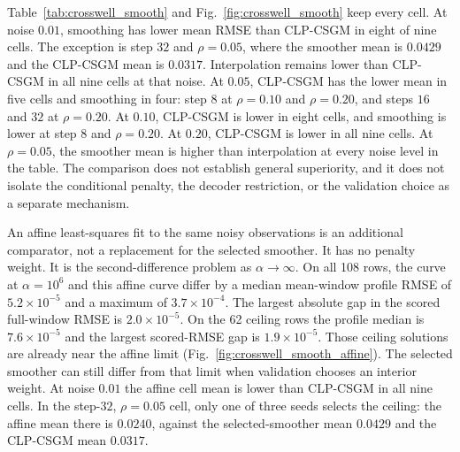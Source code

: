 \begin{table}[htbp]
  \centering
  \caption{Interpolation, validation-selected second-difference smoothing, and
  CLP-CSGM Ridge on the noise sweep. Entries are mean full-window RMSE over
  seeds $\{7,23,41\}$, rounded to four decimals. The smoother does not use
  the dense logs. These noise levels were used for sensitivity analysis and
  were not calibrated to field measurement uncertainties.}
  \label{tab:crosswell_smooth}
  \small
\end{table}

Table~\ref{tab:crosswell_smooth} and
Fig.~\ref{fig:crosswell_smooth} keep every cell. At noise $0.01$, smoothing
has lower mean RMSE than CLP-CSGM in eight of nine cells. The exception is
step $32$ and $\rho=0.05$, where the smoother mean is $0.0429$ and the
CLP-CSGM mean is $0.0317$. Interpolation remains lower than CLP-CSGM in all
nine cells at that noise. At $0.05$, CLP-CSGM has the lower mean in five
cells and smoothing in four: step $8$ at $\rho=0.10$ and $\rho=0.20$, and
steps $16$ and $32$ at $\rho=0.20$. At $0.10$, CLP-CSGM is lower in eight
cells, and smoothing is lower at step $8$ and $\rho=0.20$. At $0.20$,
CLP-CSGM is lower in all nine cells. At $\rho=0.05$, the smoother mean is
higher than interpolation at every noise level in the table. The comparison
does not establish general superiority, and it does not isolate the
conditional penalty, the decoder restriction, or the validation choice as a
separate mechanism.

An affine least-squares fit to the same noisy observations is an additional
comparator, not a replacement for the selected smoother. It has no penalty
weight. It is the second-difference problem as $\alpha\to\infty$. On all
108 rows, the curve at $\alpha=10^{6}$ and this affine curve differ by a
median mean-window profile RMSE of $5.2\times10^{-5}$ and a maximum of
$3.7\times10^{-4}$. The largest absolute gap in the scored full-window RMSE
is $2.0\times10^{-5}$. On the 62 ceiling rows the profile median is
$7.6\times10^{-5}$ and the largest scored-RMSE gap is $1.9\times10^{-5}$.
Those ceiling solutions are already near the affine limit
(Fig.~\ref{fig:crosswell_smooth_affine}). The selected smoother can still
differ from that limit when validation chooses an interior weight. At noise
$0.01$ the affine cell mean is lower than CLP-CSGM in all nine cells. In
the step-$32$, $\rho=0.05$ cell, only one of three seeds selects the
ceiling: the affine mean there is $0.0240$, against the selected-smoother
mean $0.0429$ and the CLP-CSGM mean $0.0317$.

